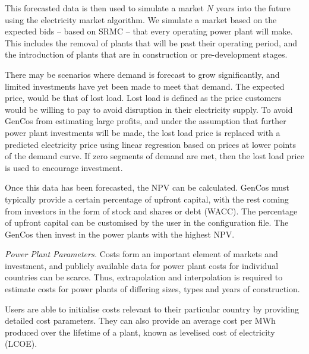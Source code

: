 This forecasted data is then used to simulate a market $N$ years into the future using the electricity market algorithm. We simulate a market based on the expected bids -- based on SRMC -- that every operating power plant will make. This includes the removal of plants that will be past their operating period, and the introduction of plants that are in construction or pre-development stages. 

There may be scenarios where demand is forecast to grow significantly, and limited investments have yet been made to meet that demand. The expected price, would be that of lost load. Lost load is defined as the price customers would be willing to pay to avoid disruption in their electricity supply. To avoid GenCos from estimating large profits, and under the assumption that further power plant investments will be made, the lost load price is replaced with a predicted electricity price using linear regression based on prices at lower points of the demand curve. If zero segments of demand are met, then the  lost load price is used to encourage investment. 

Once this data has been forecasted\vphantom{Once expected fuel prices, carbon price, discount rate, and expected sale price of electricity are all forecast}, the NPV can be calculated. GenCos must typically provide a certain percentage of upfront capital, with the rest coming from investors in the form of stock and shares or debt (WACC). The percentage of upfront capital can be customised by the user in the configuration file. The GenCos then invest in the power plants with the highest NPV. 


\textit{Power Plant Parameters.}\label{ssssec:powerplantparameters} Costs form an important element of markets and investment, and publicly available data for power plant costs for individual countries can be scarce. Thus, extrapolation and interpolation is required to estimate costs for power plants of differing sizes, types and years of construction.

Users are able to initialise costs relevant to their particular country by providing detailed cost parameters. They can also provide an average cost per MWh produced over the lifetime of a plant, known as levelised cost of electricity (LCOE).


